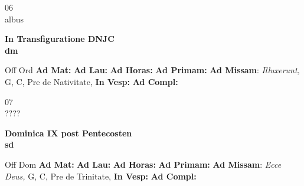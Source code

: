 \documentclass[10pt, openany]{book}
\begin{document}
    \begin{center}
        \begin{minipage}{3.5in}
            \vspace{2em}
            \begin{minipage}{0.5in}
                {\Huge 06} \\
                {\normalsize albus}
            \end{minipage}
            \begin{minipage}{3.0in}
                \textbf{ \large In Transfiguratione DNJC \\
                \textnormal{\normalsize dm}}

            \end{minipage}
            \begin{justify}Off Ord
                \textbf{Ad Mat: }
                \textbf{Ad Lau: }
                \textbf{Ad Horas: }
                \textbf{Ad Primam: }\textbf{Ad Missam}: \textit{Illuxerunt,} G, C, Pre de Nativitate, 
                \textbf{In Vesp: }
                \textbf{Ad Compl: }
            \end{justify}
        \end{minipage}
    \end{center}

    \begin{center}
        \begin{minipage}{3.5in}
            \vspace{2em}
            \begin{minipage}{0.5in}
                {\Huge 07} \\
                {\normalsize ????}
            \end{minipage}
            \begin{minipage}{3.0in}
                \textbf{ \large Dominica IX post Pentecosten \\
                \textnormal{\normalsize sd}}

            \end{minipage}
            \begin{justify}Off Dom
                \textbf{Ad Mat: }
                \textbf{Ad Lau: }
                \textbf{Ad Horas: }
                \textbf{Ad Primam: }\textbf{Ad Missam}: \textit{Ecce Deus,} G, C, Pre de Trinitate, 
                \textbf{In Vesp: }
                \textbf{Ad Compl: }
            \end{justify}
        \end{minipage}
    \end{center}
\end{document}
